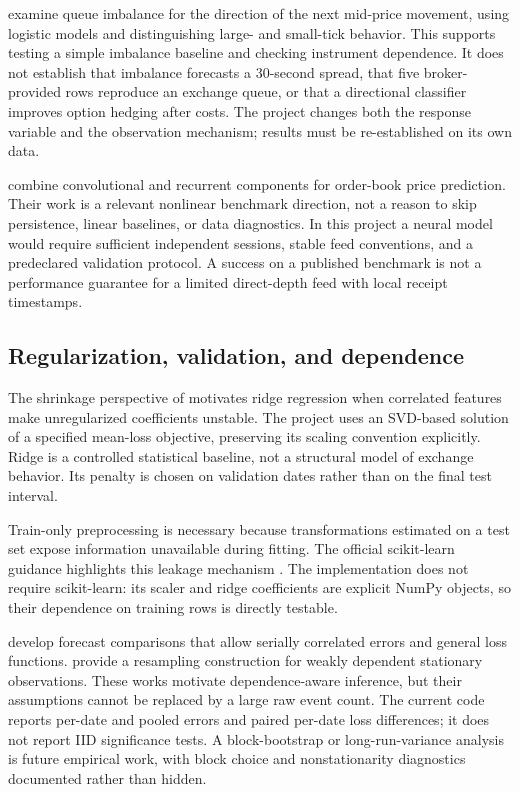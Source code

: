 \citet{gould2016} examine queue imbalance for the direction of the next mid-price movement, using logistic models and distinguishing large- and small-tick behavior. This supports testing a simple imbalance baseline and checking instrument dependence. It does not establish that imbalance forecasts a 30-second spread, that five broker-provided rows reproduce an exchange queue, or that a directional classifier improves option hedging after costs. The project changes both the response variable and the observation mechanism; results must be re-established on its own data.

\citet{zhang2019} combine convolutional and recurrent components for order-book price prediction. Their work is a relevant nonlinear benchmark direction, not a reason to skip persistence, linear baselines, or data diagnostics. In this project a neural model would require sufficient independent sessions, stable feed conventions, and a predeclared validation protocol. A success on a published benchmark is not a performance guarantee for a limited direct-depth feed with local receipt timestamps.

\subsection{Regularization, validation, and dependence}
The shrinkage perspective of \citet{hoerl1970} motivates ridge regression when correlated features make unregularized coefficients unstable. The project uses an SVD-based solution of a specified mean-loss objective, preserving its scaling convention explicitly. Ridge is a controlled statistical baseline, not a structural model of exchange behavior. Its penalty is chosen on validation dates rather than on the final test interval.

Train-only preprocessing is necessary because transformations estimated on a test set expose information unavailable during fitting. The official scikit-learn guidance highlights this leakage mechanism \citep{sklearnpitfalls}. The implementation does not require scikit-learn: its scaler and ridge coefficients are explicit NumPy objects, so their dependence on training rows is directly testable.

\citet{diebold1995} develop forecast comparisons that allow serially correlated errors and general loss functions. \citet{politis1994} provide a resampling construction for weakly dependent stationary observations. These works motivate dependence-aware inference, but their assumptions cannot be replaced by a large raw event count. The current code reports per-date and pooled errors and paired per-date loss differences; it does not report IID significance tests. A block-bootstrap or long-run-variance analysis is future empirical work, with block choice and nonstationarity diagnostics documented rather than hidden.

